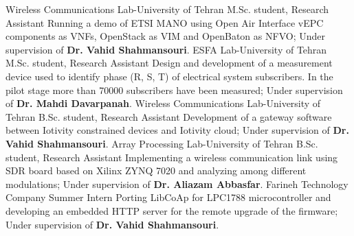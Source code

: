 {}
{Wireless Communications Lab-University of Tehran}
{M.Sc. student, Research Assistant}
{
  Running a demo of ETSI MANO using Open Air Interface vEPC components as VNFs, OpenStack as VIM and OpenBaton as NFVO;
  Under supervision of \textbf{Dr. Vahid Shahmansouri}.
}
\medskip
{}
{}
{ESFA Lab-University of Tehran}
{M.Sc. student, Research Assistant}
{
  Design and development of a measurement device used to identify phase (R, S, T) of electrical system subscribers.
  In the pilot stage more than 70000 subscribers have been measured;
  Under supervision of \textbf{Dr. Mahdi Davarpanah}.
}
\medskip
{}
{}
{Wireless Communications Lab-University of Tehran}
{B.Sc. student, Research Assistant}
{
  Development of a gateway software between Iotivity constrained devices and Iotivity cloud;
  Under supervision of \textbf{Dr. Vahid Shahmansouri}.
}
\medskip
{}
{}
{Array Processing Lab-University of Tehran}
{B.Sc. student, Research Assistant}
{
  Implementing a wireless communication link using SDR board based on Xilinx ZYNQ 7020 and analyzing among different modulations;
  Under supervision of \textbf{Dr. Aliazam Abbasfar}.
}
\medskip
{}
{}
{Farineh Technology Company}
{Summer Intern}
{
  Porting LibCoAp for LPC1788 microcontroller and developing an embedded HTTP server for the remote upgrade of the firmware;
  Under supervision of \textbf{Dr. Vahid Shahmansouri}.
}
\medskip
